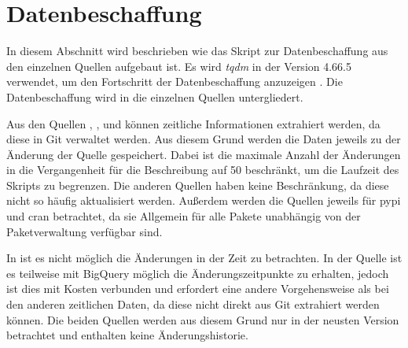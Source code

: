 \section{Datenbeschaffung}
\label{sec:datenbeschaffung}
In diesem Abschnitt wird beschrieben wie das Skript zur Datenbeschaffung aus den einzelnen Quellen aufgebaut ist.
Es wird \emph{tqdm} in der Version 4.66.5 verwendet, um den Fortschritt der Datenbeschaffung anzuzeigen \autocite{costa-luis_tqdm_2024}.
Die Datenbeschaffung wird in die einzelnen Quellen untergliedert.

Aus den Quellen , ,  und  können zeitliche Informationen extrahiert werden, da diese in Git verwaltet werden.
Aus diesem Grund werden die Daten jeweils zu der Änderung der Quelle gespeichert.
Dabei ist die maximale Anzahl der Änderungen in die Vergangenheit für die Beschreibung auf 50 beschränkt, um die Laufzeit des Skripts zu begrenzen.
Die anderen Quellen haben keine Beschränkung, da diese nicht so häufig aktualisiert werden.
Außerdem werden die Quellen jeweils für \gls{pypi} und \gls{cran} betrachtet, da sie Allgemein für alle Pakete unabhängig von der Paketverwaltung verfügbar sind.

In  ist es nicht möglich die Änderungen in der Zeit zu betrachten.
In der  Quelle ist es teilweise mit BigQuery möglich die Änderungszeitpunkte zu erhalten, jedoch ist dies mit Kosten verbunden und erfordert eine andere Vorgehensweise als bei den anderen zeitlichen Daten, da diese nicht direkt aus Git extrahiert werden können.
Die beiden Quellen werden aus diesem Grund nur in der neusten Version betrachtet und enthalten keine Änderungshistorie.







